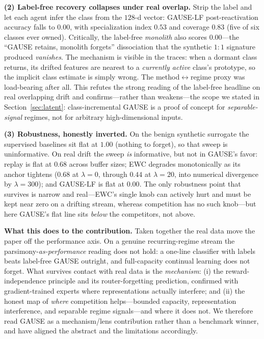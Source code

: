 \documentclass[10pt]{article}
\begin{document}
\textbf{(2) Label-free recovery collapses under real overlap.} Strip the label and
let each agent infer the class from the $128$-d vector: GAUSE-LF post-reactivation
accuracy falls to $0.00$, with specialization index $0.53$ and coverage $0.83$
(five of six classes ever owned). Critically, the label-free \emph{monolith} also
scores $0.00$---the ``GAUSE retains, monolith forgets'' dissociation that the
synthetic $1{:}1$ signature produced \emph{vanishes}. The mechanism is visible in
the traces: when a dormant class returns, its drifted features are nearest to a
\emph{currently active} class's prototype, so the implicit class estimate is simply
wrong. The method$\leftrightarrow$regime proxy was load-bearing after all. This
refutes the strong reading of the label-free headline on real overlapping drift and
confirms---rather than weakens---the scope we stated in
Section~\ref{sec:latent}: class-incremental GAUSE is a proof of concept for
\emph{separable-signal} regimes, not for arbitrary high-dimensional inputs.

\textbf{(3) Robustness, honestly inverted.} On the benign synthetic surrogate the
supervised baselines sit flat at $1.00$ (nothing to forget), so that sweep is
uninformative. On real drift the sweep \emph{is} informative, but not in GAUSE's
favor: replay is flat at $0.68$ across buffer sizes; EWC degrades monotonically as
its anchor tightens ($0.68$ at $\lambda{=}0$, through $0.44$ at $\lambda{=}20$, into
numerical divergence by $\lambda{=}300$); and GAUSE-LF is flat at $0.00$. The only
robustness point that survives is narrow and real---EWC's single knob can actively
hurt and must be kept near zero on a drifting stream, whereas competition has no
such knob---but here GAUSE's flat line sits \emph{below} the competitors, not above.

\textbf{What this does to the contribution.} Taken together the real data move the
paper off the performance axis. On a genuine recurring-regime stream the
parsimony-\emph{as-performance} reading does not hold: a one-line classifier with
labels beats label-free GAUSE outright, and full-capacity continual learning does
not forget. What survives contact with real data is the \emph{mechanism}: (i) the
reward-independence principle and its router-forgetting prediction, confirmed with
gradient-trained experts where representations actually interfere; and (ii) the
honest map of \emph{where} competition helps---bounded capacity, representation
interference, and separable regime signals---and where it does not. We therefore
read GAUSE as a mechanism/lens contribution rather than a benchmark winner, and have
aligned the abstract and the limitations accordingly.
\end{document}
